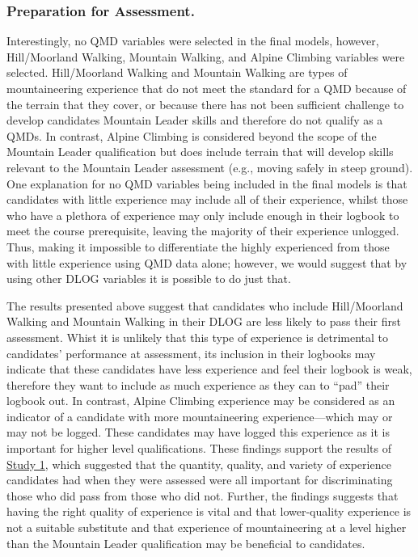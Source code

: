\documentclass[
  12pt,
  a4paper,
]{book}
\begin{document}
\hypertarget{study-4-preparation-for-assessment}{%
\subsubsection{Preparation for Assessment.}\label{study-4-preparation-for-assessment}}

Interestingly, no QMD variables were selected in the final models, however, Hill/Moorland Walking, Mountain Walking, and Alpine Climbing variables were selected. Hill/Moorland Walking and Mountain Walking are types of mountaineering experience that do not meet the standard for a QMD because of the terrain that they cover, or because there has not been sufficient challenge to develop candidates Mountain Leader skills and therefore do not qualify as a QMDs. In contrast, Alpine Climbing is considered beyond the scope of the Mountain Leader qualification but does include terrain that will develop skills relevant to the Mountain Leader assessment (e.g., moving safely in steep ground). One explanation for no QMD variables being included in the final models is that candidates with little experience may include all of their experience, whilst those who have a plethora of experience may only include enough in their logbook to meet the course prerequisite, leaving the majority of their experience unlogged. Thus, making it impossible to differentiate the highly experienced from those with little experience using QMD data alone; however, we would suggest that by using other DLOG variables it is possible to do just that.

The results presented above suggest that candidates who include Hill/Moorland Walking and Mountain Walking in their DLOG are less likely to pass their first assessment. Whist it is unlikely that this type of experience is detrimental to candidates' performance at assessment, its inclusion in their logbooks may indicate that these candidates have less experience and feel their logbook is weak, therefore they want to include as much experience as they can to ``pad'' their logbook out. In contrast, Alpine Climbing experience may be considered as an indicator of a candidate with more mountaineering experience---which may or may not be logged. These candidates may have logged this experience as it is important for higher level qualifications. These findings support the results of \protect\hyperlink{ml-qualitative}{Study 1}, which suggested that the quantity, quality, and variety of experience candidates had when they were assessed were all important for discriminating those who did pass from those who did not. Further, the findings suggests that having the right quality of experience is vital and that lower-quality experience is not a suitable substitute and that experience of mountaineering at a level higher than the Mountain Leader qualification may be beneficial to candidates.
\end{document}
